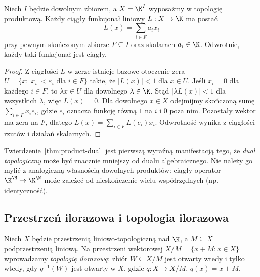 \begin{twierdzenie}\label{thm:product-dual}
Niech $I$ będzie dowolnym zbiorem, a $X=\K^I$ wyposażmy
w topologię produktową. Każdy ciągły funkcjonał liniowy
$L:X\to\K$ ma postać
\[
 L(x)=\sum_{i\in F}a_i x_i
\]
przy pewnym skończonym zbiorze $F\subseteq I$ oraz
skalarach $a_i\in\K$. Odwrotnie, każdy taki funkcjonał
jest ciągły.
\end{twierdzenie}
\begin{proof}
Z ciągłości $L$ w zerze istnieje bazowe otoczenie zera
$U=\{x:|x_i|<\varepsilon_i\text{ dla }i\in F\}$
takie, że $|L(x)|<1$ dla $x\in U$.
Jeśli $x_i=0$ dla każdego $i\in F$, to $\lambda x\in U$
dla dowolnego $\lambda\in\K$. Stąd
$|\lambda L(x)|<1$ dla wszystkich $\lambda$, więc $L(x)=0$.
Dla dowolnego $x\in X$ odejmijmy skończoną sumę
$\sum_{i\in F}x_i e_i$, gdzie $e_i$ oznacza funkcję
równą $1$ na $i$ i $0$ poza nim. Pozostały wektor
ma zera na $F$, dlatego $L(x)=\sum_{i\in F}L(e_i)x_i$.
Odwrotność wynika z ciągłości rzutów i działań skalarnych.
\end{proof}

\begin{uwaga}
Twierdzenie~\ref{thm:product-dual} jest pierwszą wyraźną
manifestacją tego, że \emph{dual topologiczny} może być
znacznie mniejszy od dualu algebraicznego. Nie należy go
mylić z analogiczną własnością dowolnych produktów:
ciągły operator $\K^{\N}\to\K^{\N}$ może zależeć
od nieskończenie wielu współrzędnych (np. identyczność).
\end{uwaga}

\subsection{Przestrzeń ilorazowa i topologia ilorazowa}

\begin{definicja}
Niech $X$ będzie przestrzenią liniowo-topologiczną nad $\K$,
a $M\subseteq X$ podprzestrzenią liniową. Na przestrzeni
wektorowej $X/M=\{x+M:x\in X\}$ wprowadzamy
\emph{topologię ilorazową}: zbiór $W\subseteq X/M$
jest otwarty wtedy i tylko wtedy, gdy $q^{-1}(W)$
jest otwarty w $X$, gdzie $q:X\to X/M$, $q(x)=x+M$.
\end{definicja}

